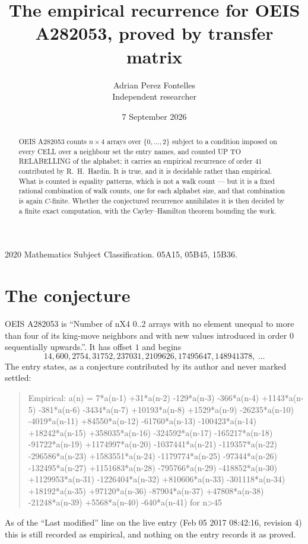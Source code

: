 \documentclass[11pt,a4paper]{article}
\title{The empirical recurrence for OEIS A282053, proved by transfer matrix}
\author{Adrian Perez Fontelles\\ \small Independent researcher}
\date{7 September 2026}
\theoremstyle{plain}
\theoremstyle{definition}
\begin{document}
\maketitle

\begin{abstract}
OEIS A282053 counts $n\times4$ arrays over $\{0,\dots,2\}$ subject to a condition imposed on
every CELL over a neighbour set the entry names, and counted UP TO RELABELLING of the
alphabet; it carries an empirical recurrence of order $41$ contributed by
R.~H.~Hardin. It is true, and it is decidable rather than empirical. What is counted is
equality patterns, which is not a walk count --- but it is a fixed rational combination of
walk counts, one for each alphabet size, and that combination is again $C$-finite. Whether the
conjectured recurrence annihilates it is then decided by a finite exact computation, with the
Cayley--Hamilton theorem bounding the work.
\end{abstract}

\noindent\small 2020 Mathematics Subject Classification. 05A15, 05B45, 15B36.\normalsize

\section{The conjecture}

OEIS A282053 is ``Number of nX4 0..2 arrays with no element unequal to more than four of its king-move neighbors and with new values introduced in order 0 sequentially upwards.''. It has offset $1$ and begins
\[
14, 600, 2754, 31752, 237031, 2109626, 17495647, 148941378,\ \dots
\]
The entry states, as a conjecture contributed by its author and never marked settled:
\begin{quote}
Empirical: a(n) = 7*a(n-1) +31*a(n-2) -129*a(n-3) -366*a(n-4) +1143*a(n-5) -381*a(n-6) -3434*a(n-7) +10193*a(n-8) +1529*a(n-9) -26235*a(n-10) -4019*a(n-11) +84550*a(n-12) -61760*a(n-13) -100423*a(n-14) +18242*a(n-15) +358035*a(n-16) -324592*a(n-17) -165217*a(n-18) -91722*a(n-19) +1174997*a(n-20) -1037441*a(n-21) -119357*a(n-22) -296586*a(n-23) +1583551*a(n-24) -1179774*a(n-25) -97344*a(n-26) -132495*a(n-27) +1151683*a(n-28) -795766*a(n-29) -418852*a(n-30) +1129953*a(n-31) -1226404*a(n-32) +810606*a(n-33) -301118*a(n-34) +18192*a(n-35) +97120*a(n-36) -87904*a(n-37) +47808*a(n-38) -21248*a(n-39) +5568*a(n-40) -640*a(n-41) for n>45
\end{quote}
As of the ``Last modified'' line on the live entry (Feb 05 2017 08:42:16, revision 4) this is still
recorded as empirical, and nothing on the entry records it as proved.
\end{document}
